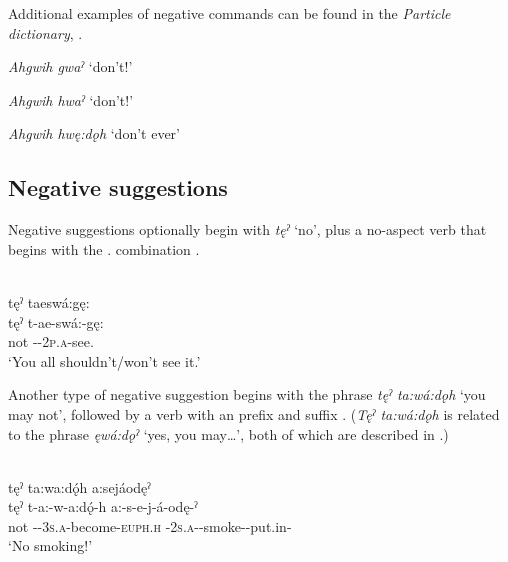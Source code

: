 Additional examples of negative commands can be found in the \textit{Particle dictionary}, .

\begin{CayugaRelated}
\item{}\textit{Ahgwih gwaˀ} ‘don’t!’\\
\item{}\textit{Ahgwih hwaˀ} ‘don’t!’\\
\item{}\textit{Ahgwih hwę:dǫh} ‘don’t ever’
\end{CayugaRelated}



\subsection{Negative suggestions} \label{Negative suggestions}
Negative suggestions optionally begin with \textit{tęˀ} ‘no’, plus a no-aspect verb that begins with the  \textsc{\contrastive.\indefinite} combination .
 
\ea\label{ex:negsuggex} {} \\
tęˀ taeswá:gę: \\
\gll tęˀ t-ae-swá:-gę:\\
not  {\contrastive}-{\indefinite}-\textsc{2p.a}-see.{\noaspect}\\
\glt ‘You all shouldn’t/won’t see it.’ \\
\z


Another type of negative suggestion begins with the phrase \textit{tęˀ ta:wá:dǫh} ‘you may not’, followed by a verb with an  {\indefinite} prefix and  {\punctual} suffix . (\textit{Tęˀ ta:wá:dǫh} is related to the phrase \textit{ęwá:dǫˀ} ‘yes, you may…’, both of which are described in .)
	
\ea\label{ex:negsuggex2} \\
tęˀ  ta:wa:dǫ́h  a:sejáodęˀ \\
\gll tęˀ t-a:-w-a:dǫ́-h a:-s-e-j-á-odę-ˀ\\
not {\contrastive}-{\indefinite}-\textsc{3s.a}-become-\textsc{euph.h} {\indefinite}-\textsc{2s.a}-{\joinerE}-smoke-{\joinerA}-put.in-{\punctual}\\
\glt ‘No smoking!’

